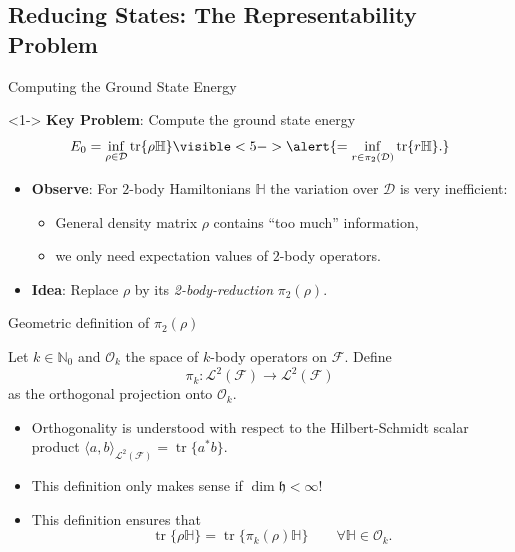 \documentclass{beamer}
\DeclareMathOperator{\tr}{tr}
\newcommand{\IN}{\ensuremath{\mathbb{N}}}
\newcommand{\HS}{{\mathcal{L}^2(\FockSpace)}}
\newcommand{\HilbertSpace}{\ensuremath{\mathfrak{h}}}
\newcommand{\FockSpace}{\mathcal{F}}
\newcommand{\Hamiltonian}{\mathbb{H}}
\newcommand{\DensityMatrices}{\mathcal{D}}
\newcommand{\kbOp}[1][k]{{\ensuremath{\mathcal{O}_{#1}}}}
\newcommand{\PkbOp}[1][k]{{\ensuremath{\pi_{#1}}}}
\begin{document}
\subsection{Reducing States: The Representability Problem}
\begin{frame}{Computing the Ground State Energy}
    \begin{block}{}<1->
        \textbf{Key Problem}: Compute the ground state energy
        \begin{equation}
            \label{GSE}
            E_0=\inf_{\rho\in\DensityMatrices}\tr\{\rho\Hamiltonian\}
            \visible<5->{
              \alert{=\inf_{r\in\pi_2(\DensityMatrices)}\tr\{r\Hamiltonian\}.}
            }
        \end{equation}
    \end{block}
    \begin{itemize}
        \item<2-> \textbf{Observe}: For $2$-body Hamiltonians $\Hamiltonian$ the variation over
        $\DensityMatrices$ is very inefficient:
        \begin{itemize}
            \item<3-> General density matrix $\rho$ contains ``too much'' information,
            \item<3-> we only need expectation values of $2$-body operators.
        \end{itemize}
      \item<4-> \textbf{Idea}: Replace $\rho$ by its \emph{2-body-reduction} $\PkbOp[2](\rho)$.
    \end{itemize}
\end{frame}

\begin{frame}{Geometric definition of $\PkbOp[2](\rho)$}
    \begin{definition}
      Let $k\in\IN_0$ and $\kbOp$ the space of $k$-body operators on $\FockSpace$. Define
      \begin{equation}
        \PkbOp:\HS\to\HS
      \end{equation}
      as the orthogonal projection onto $\kbOp$.
    \end{definition}
    \begin{itemize}
      \item Orthogonality is understood with respect to the Hilbert-Schmidt
        scalar product $\langle a,b\rangle_{\HS}=\tr\{a^*b\}$.
      \item This definition only makes sense if $\dim\HilbertSpace<\infty$!
      \item This definition ensures that
        \begin{equation}
          \tr\{\rho\Hamiltonian\}=\tr\{\PkbOp(\rho)\Hamiltonian\}
          \qquad\forall\Hamiltonian\in\kbOp.
        \end{equation}
    \end{itemize}
\end{frame}
\end{document}
